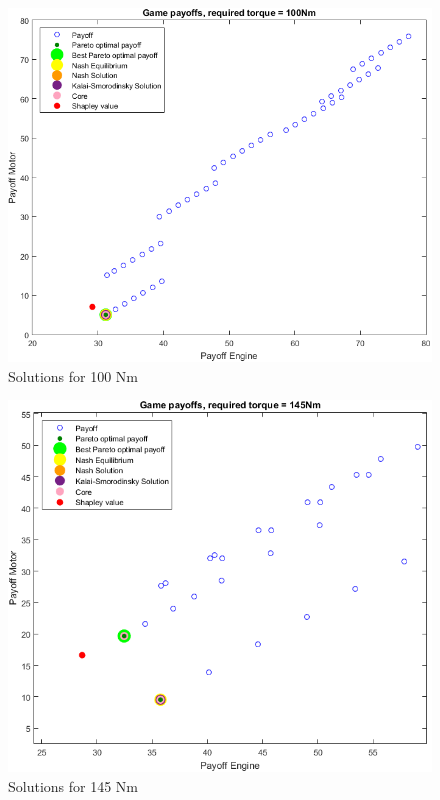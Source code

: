 \begin{figure}[h]
	\centering
	\includegraphics[scale=0.55]{figures/gametheory/100nm}
	\caption{Solutions for 100 Nm}
	\label{fig:100nm}
\end{figure}

\begin{figure}[h]
	\centering
	\includegraphics[scale=0.59]{figures/gametheory/145nm}
  	\caption{Solutions for 145 Nm}
  	\label{fig:145nm}
\end{figure}


